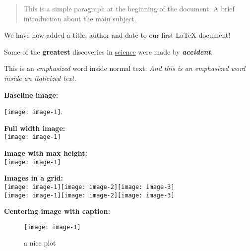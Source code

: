 




\maketitle

\begin{abstract}
  This is a simple paragraph at the beginning of the document. A brief introduction about the main subject.
\end{abstract}
 
We have now added a title, author and date to our first \LaTeX{} document!

Some of the \textbf{greatest}
discoveries in \underline{science} 
were made by \textbf{\textit{accident}}.

This is an \emph{emphasized} word inside normal text. \textit{And this is an \emph{emphasized} word inside an italicized text.}

\textbf{Baseline image:}

\blindtext\texttt{[image: image-1]}.

\newpage

\textbf{Full width image:}
\\ %
\texttt{[image: image-1]}

\textbf{Image with max height:}
\\
\texttt{[image: image-1]}

\newpage

\textbf{Images in a grid:}
\\
\texttt{[image: image-1]}\quad\texttt{[image: image-2]}\quad\texttt{[image: image-3]}
\\[\baselineskip]%
\texttt{[image: image-1]}\quad\texttt{[image: image-2]}\quad\texttt{[image: image-3]}

\textbf{Centering image with caption:}
\\
\begin{figure}[h]
  \centering
  \texttt{[image: image-1]}
  \caption{a nice plot}
  \label{fig:image1}
\end{figure}

